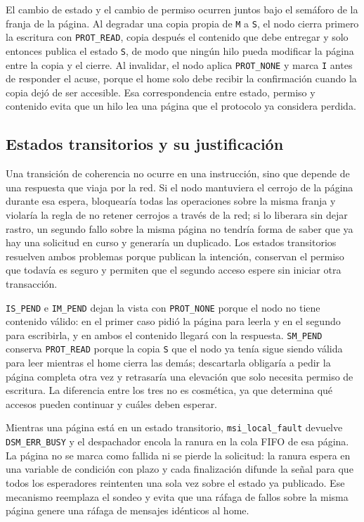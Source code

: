 El cambio de estado y el cambio de permiso ocurren juntos bajo el semáforo de la franja de la página. Al degradar una copia propia de \texttt{M} a \texttt{S}, el nodo cierra primero la escritura con \texttt{PROT\_READ}, copia después el contenido que debe entregar y solo entonces publica el estado \texttt{S}, de modo que ningún hilo pueda modificar la página entre la copia y el cierre. Al invalidar, el nodo aplica \texttt{PROT\_NONE} y marca \texttt{I} antes de responder el acuse, porque el home solo debe recibir la confirmación cuando la copia dejó de ser accesible. Esa correspondencia entre estado, permiso y contenido evita que un hilo lea una página que el protocolo ya considera perdida.

\subsection{Estados transitorios y su justificación}\label{sec:msi-transitorios}

Una transición de coherencia no ocurre en una instrucción, sino que depende de una respuesta que viaja por la red. Si el nodo mantuviera el cerrojo de la página durante esa espera, bloquearía todas las operaciones sobre la misma franja y violaría la regla de no retener cerrojos a través de la red; si lo liberara sin dejar rastro, un segundo fallo sobre la misma página no tendría forma de saber que ya hay una solicitud en curso y generaría un duplicado. Los estados transitorios resuelven ambos problemas porque publican la intención, conservan el permiso que todavía es seguro y permiten que el segundo acceso espere sin iniciar otra transacción.

\texttt{IS\_PEND} e \texttt{IM\_PEND} dejan la vista con \texttt{PROT\_NONE} porque el nodo no tiene contenido válido: en el primer caso pidió la página para leerla y en el segundo para escribirla, y en ambos el contenido llegará con la respuesta. \texttt{SM\_PEND} conserva \texttt{PROT\_READ} porque la copia \texttt{S} que el nodo ya tenía sigue siendo válida para leer mientras el home cierra las demás; descartarla obligaría a pedir la página completa otra vez y retrasaría una elevación que solo necesita permiso de escritura. La diferencia entre los tres no es cosmética, ya que determina qué accesos pueden continuar y cuáles deben esperar.

Mientras una página está en un estado transitorio, \texttt{msi\_local\_fault} devuelve \texttt{DSM\_ERR\_BUSY} y el despachador encola la ranura en la cola FIFO de esa página. La página no se marca como fallida ni se pierde la solicitud: la ranura espera en una variable de condición con plazo y cada finalización difunde la señal para que todos los esperadores reintenten una sola vez sobre el estado ya publicado. Ese mecanismo reemplaza el sondeo y evita que una ráfaga de fallos sobre la misma página genere una ráfaga de mensajes idénticos al home.


